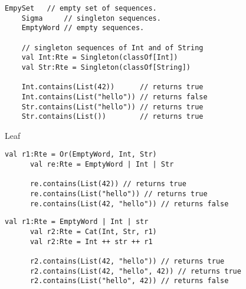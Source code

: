 \newsavebox\leafbox
\begin{lrbox}{\leafbox}
  \begin{minipage}{12cm}
    \begin{lstlisting}[style=scalaioScala]
    EmpySet   // empty set of sequences.
    Sigma     // singleton sequences.
    EmptyWord // empty sequences.

    // singleton sequences of Int and of String
    val Int:Rte = Singleton(classOf[Int])    
    val Str:Rte = Singleton(classOf[String])

    Int.contains(List(42))      // returns true
    Int.contains(List("hello")) // returns false
    Str.contains(List("hello")) // returns true
    Str.contains(List())        // returns true
    \end{lstlisting}
  \end{minipage}
\end{lrbox}

\begin{frame}{Leaf}
  \usebox\leafbox
\end{frame}

\newsavebox\orbox
\begin{lrbox}{\orbox}
  \begin{minipage}{12cm}
    \begin{lstlisting}[style=scalaioScala]
      val r1:Rte = Or(EmptyWord, Int, Str)
      val re:Rte = EmptyWord | Int | Str
      
      re.contains(List(42)) // returns true
      re.contains(List("hello")) // returns true
      re.contains(List(42, "hello")) // returns false

    \end{lstlisting}
  \end{minipage}
\end{lrbox}

\newsavebox\catbox
\begin{lrbox}{\catbox}
  \begin{minipage}{12cm}
    \begin{lstlisting}[style=scalaioScala]
      val r1:Rte = EmptyWord | Int | str
      val r2:Rte = Cat(Int, Str, r1)
      val r2:Rte = Int ++ str ++ r1

      r2.contains(List(42, "hello")) // returns true
      r2.contains(List(42, "hello", 42)) // returns true
      r2.contains(List("hello", 42)) // returns false
    \end{lstlisting}
  \end{minipage}
\end{lrbox}


